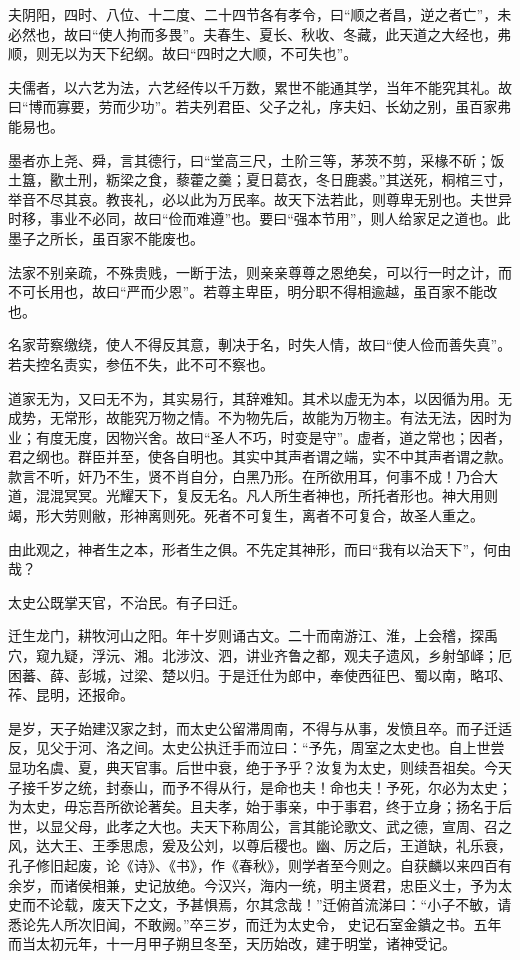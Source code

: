 \documentclass[]{article}
\begin{document}
夫阴阳，四时、八位、十二度、二十四节各有孝令，曰``顺之者昌，逆之者亡''，未必然也，故曰``使人拘而多畏''。夫春生、夏长、秋收、冬藏，此天道之大经也，弗顺，则无以为天下纪纲。故曰``四时之大顺，不可失也''。

夫儒者，以六艺为法，六艺经传以千万数，累世不能通其学，当年不能究其礼。故曰``博而寡要，劳而少功''。若夫列君臣、父子之礼，序夫妇、长幼之别，虽百家弗能易也。

墨者亦上尧、舜，言其德行，曰``堂高三尺，土阶三等，茅茨不剪，采椽不斫；饭土簋，歠土刑，粝梁之食，藜藿之羹；夏日葛衣，冬日鹿裘。''其送死，桐棺三寸，举音不尽其哀。教丧礼，必以此为万民率。故天下法若此，则尊卑无别也。夫世异时移，事业不必同，故曰``俭而难遵''也。要曰``强本节用''，则人给家足之道也。此墨子之所长，虽百家不能废也。

法家不别亲疏，不殊贵贱，一断于法，则亲亲尊尊之恩绝矣，可以行一时之计，而不可长用也，故曰``严而少恩''。若尊主卑臣，明分职不得相逾越，虽百家不能改也。

名家苛察缴绕，使人不得反其意，剸决于名，时失人情，故曰``使人俭而善失真''。若夫控名责实，参伍不失，此不可不察也。

道家无为，又曰无不为，其实易行，其辞难知。其术以虚无为本，以因循为用。无成势，无常形，故能究万物之情。不为物先后，故能为万物主。有法无法，因时为业；有度无度，因物兴舍。故曰``圣人不巧，时变是守''。虚者，道之常也；因者，君之纲也。群臣并至，使各自明也。其实中其声者谓之端，实不中其声者谓之款。款言不听，奸乃不生，贤不肖自分，白黑乃形。在所欲用耳，何事不成！乃合大道，混混冥冥。光耀天下，复反无名。凡人所生者神也，所托者形也。神大用则竭，形大劳则敝，形神离则死。死者不可复生，离者不可复合，故圣人重之。

由此观之，神者生之本，形者生之俱。不先定其神形，而曰``我有以治天下''，何由哉？

太史公既掌天官，不治民。有子曰迁。

迁生龙门，耕牧河山之阳。年十岁则诵古文。二十而南游江、淮，上会稽，探禹穴，窥九疑，浮沅、湘。北涉汶、泗，讲业齐鲁之都，观夫子遗风，乡射邹峄；厄困蕃、薛、彭城，过梁、楚以归。于是迁仕为郎中，奉使西征巴、蜀以南，略邛、莋、昆明，还报命。

是岁，天子始建汉家之封，而太史公留滞周南，不得与从事，发愤且卒。而子迁适反，见父于河、洛之间。太史公执迁手而泣曰：``予先，周室之太史也。自上世尝显功名虞、夏，典天官事。后世中衰，绝于予乎？汝复为太史，则续吾祖矣。今天子接千岁之统，封泰山，而予不得从行，是命也夫！命也夫！予死，尔必为太史；为太史，毋忘吾所欲论著矣。且夫孝，始于事亲，中于事君，终于立身；扬名于后世，以显父母，此孝之大也。夫天下称周公，言其能论歌文、武之德，宣周、召之风，达大王、王季思虑，爰及公刘，以尊后稷也。幽、厉之后，王道缺，礼乐衰，孔子修旧起废，论《诗》、《书》，作《春秋》，则学者至今则之。自获麟以来四百有余岁，而诸侯相兼，史记放绝。今汉兴，海内一统，明主贤君，忠臣义士，予为太史而不论载，废天下之文，予甚惧焉，尔其念哉！''迁俯首流涕曰：``小子不敏，请悉论先人所次旧闻，不敢阙。''卒三岁，而迁为太史令，史记石室金鐀之书。五年而当太初元年，十一月甲子朔旦冬至，天历始改，建于明堂，诸神受记。
\end{document}
